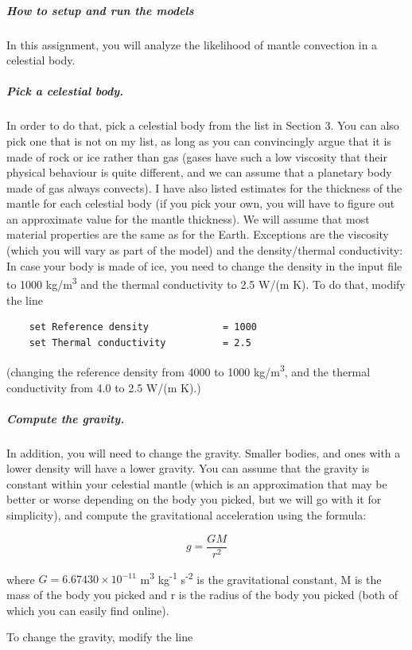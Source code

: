 \subparagraph{How to setup and run the models}

In this assignment, you will analyze the likelihood of mantle convection in a celestial body.

\subparagraph{Pick a celestial body.}
In order to do that, pick a celestial body from the list in Section 3. You can also pick one that is not on my list, as long as you can convincingly argue that it is made of rock or ice rather than gas (gases have such a low viscosity that their physical behaviour is quite different, and we can assume that a planetary body made of gas always convects).
I have also listed estimates for the thickness of the mantle for each celestial body (if you pick your own, you will have to figure out an approximate value for the mantle thickness). We will assume that most material properties are the same as for the Earth. Exceptions are the viscosity (which you will vary as part of the model) and the density/thermal conductivity: In case your body is made of ice, you need to change the density in the input file to 1000 kg/m\textsuperscript{3} and the thermal conductivity to 2.5 W/(m K). To do that, modify the line

\begin{verbatim}
    set Reference density             = 1000
    set Thermal conductivity          = 2.5
\end{verbatim}

(changing the reference density from 4000 to 1000 kg/m\textsuperscript{3}, and the thermal conductivity from 4.0 to 2.5 W/(m K).)

\subparagraph{Compute the gravity.}
In addition, you will need to change the gravity. Smaller bodies, and ones with a lower density will have a lower gravity. You can assume that the gravity is constant within your celestial mantle (which is an approximation that may be better or worse depending on the body you picked, but we will go with it for simplicity), and compute the gravitational acceleration using the formula:

\begin{equation}
  g = \frac{G M}{r^2}
\end{equation}

where $G = 6.67430 \times 10^{-11}$	m\textsuperscript{3} kg\textsuperscript{-1} s\textsuperscript{-2} is the gravitational constant, 
M is the mass of the body you picked and r is the radius of the body you picked
(both of which you can easily find online). 

To change the gravity, modify the line

